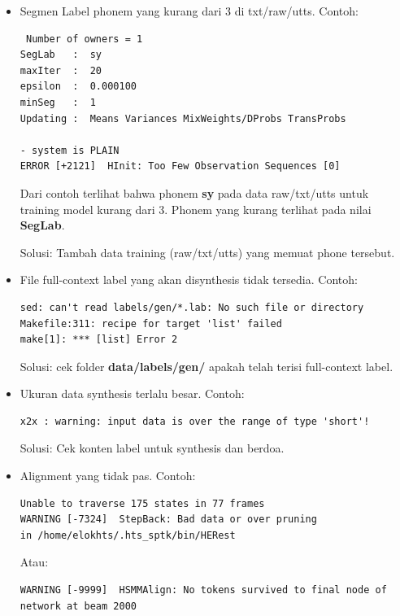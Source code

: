 \documentclass[12pt,]{article}
\begin{document}
	\begin{itemize}
		\item Segmen Label phonem yang kurang dari 3 di txt/raw/utts.
		Contoh:
		\begin{verbatim}
 Number of owners = 1
SegLab   :  sy
maxIter  :  20
epsilon  :  0.000100
minSeg   :  1
Updating :  Means Variances MixWeights/DProbs TransProbs

- system is PLAIN
ERROR [+2121]  HInit: Too Few Observation Sequences [0]
		\end{verbatim}
		
		Dari contoh terlihat bahwa phonem \textbf{sy} pada data raw/txt/utts untuk training model kurang dari 3.
		Phonem yang kurang terlihat pada nilai \textbf{SegLab}.
		
		Solusi: Tambah data training (raw/txt/utts) yang memuat phone tersebut.
		
		\item File full-context label yang akan disynthesis tidak tersedia.
		Contoh:
		\begin{verbatim}
sed: can't read labels/gen/*.lab: No such file or directory
Makefile:311: recipe for target 'list' failed
make[1]: *** [list] Error 2
		\end{verbatim}
		
		Solusi: cek folder \textbf{data/labels/gen/} apakah telah terisi full-context label.
		
		\item Ukuran data synthesis terlalu besar.
		Contoh:
		\begin{verbatim}
x2x : warning: input data is over the range of type 'short'!
		\end{verbatim}
		
		Solusi: Cek konten label untuk synthesis dan berdoa.
		
		\item Alignment yang tidak pas.
		Contoh:
		\begin{verbatim}
Unable to traverse 175 states in 77 frames
WARNING [-7324]  StepBack: Bad data or over pruning
in /home/elokhts/.hts_sptk/bin/HERest
		\end{verbatim}
		
		Atau:
		\begin{verbatim}
WARNING [-9999]  HSMMAlign: No tokens survived to final node of network at beam 2000
		\end{verbatim}
		

\end{itemize}
\end{document}
